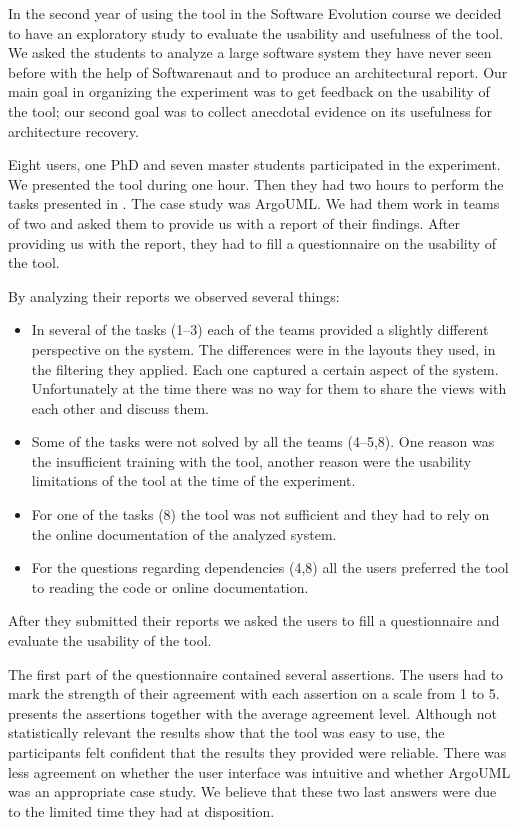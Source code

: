\documentclass[preprint,12pt]{elsarticle}
\begin{document}
In the second year of using the tool in the Software Evolution course we decided to have an exploratory study to evaluate the usability and usefulness of the tool. We asked the students to analyze a large software system they have never seen before with the help of Softwarenaut and to produce an architectural report. Our main goal in organizing the experiment was to get feedback on the usability of the tool; our second goal was to collect anecdotal evidence on its usefulness for architecture recovery.

Eight users, one PhD and seven master students participated in the experiment. We presented the tool during one hour. Then they had two hours to perform the tasks presented in . The case study was ArgoUML. We had them work in teams of two and asked them to provide us with a report of their findings. After providing us with the report, they had to fill a questionnaire on the usability of the tool. 


By analyzing their reports we observed several things:

\begin{itemize}
\item In several of the tasks (1--3) each of the teams provided a slightly different perspective on the system. The differences were in the layouts they used, in the filtering they applied. Each one captured a certain aspect of the system. Unfortunately at the time there was no way for them to share the views with each other and discuss them.
\item Some of the tasks were not solved by all the teams (4--5,8). One reason was the insufficient training with the tool, another reason were the usability limitations of the tool at the time of the experiment. %
\item For one of the tasks (8) the tool was not sufficient and they had to rely on the online documentation of the analyzed system. 
\item For the questions regarding dependencies (4,8) all the users preferred the tool to reading the code or online documentation.
\end{itemize}

After they submitted their reports we asked the users to fill a questionnaire and evaluate the usability of the tool. 

The first part of the questionnaire contained several assertions. The users had to mark the strength of their agreement with each assertion on a scale from 1 to 5.  presents the assertions together with the average agreement level. Although not statistically relevant the results show that the tool was easy to use, the participants felt confident that the results they provided were reliable.%
 There was less agreement on whether the user interface was intuitive and whether ArgoUML was an appropriate case study. We believe that these two last answers were due to the limited time they had at disposition. %
\end{document}
